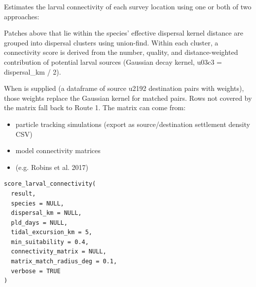\documentclass[a4paper]{book}
\begin{document}
\begin{Description}
Estimates the larval connectivity of each survey location using one or both
of two approaches:

Patches above  that lie within the species' effective
dispersal kernel distance are grouped into dispersal clusters using
union-find. Within each cluster, a connectivity score is derived from the
number, quality, and distance-weighted contribution of potential larval
sources (Gaussian decay kernel, \bsl{}u03c3 = dispersal\_km / 2).

When  is supplied (a dataframe of source \bsl{}u2192 destination
pairs with weights), those weights replace the Gaussian kernel for matched
pairs. Rows not covered by the matrix fall back to Route 1. The matrix can
come from:
\begin{itemize}

\item{}  particle tracking simulations (export as source/destination
settlement density CSV)
\item{}  model connectivity matrices
\item{}  (e.g. Robins et al. 2017)

\end{itemize}

\end{Description}
%
\begin{Usage}
\begin{verbatim}
score_larval_connectivity(
  result,
  species = NULL,
  dispersal_km = NULL,
  pld_days = NULL,
  tidal_excursion_km = 5,
  min_suitability = 0.4,
  connectivity_matrix = NULL,
  matrix_match_radius_deg = 0.1,
  verbose = TRUE
)
\end{verbatim}
\end{Usage}
%
\end{document}

